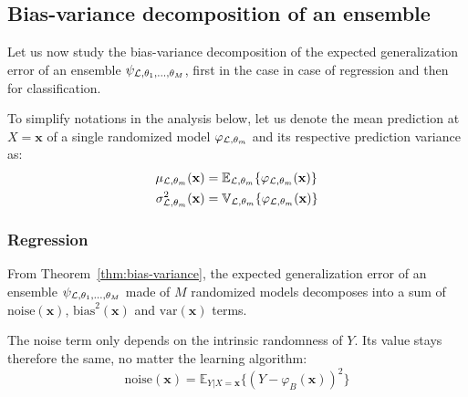 \subsection{Bias-variance decomposition of an ensemble}
\label{sec:4:bias-variance:ensemble}

Let us now study the bias-variance decomposition of the expected generalization
error of an ensemble $\psi_{{\cal L},\theta_1,\dots,\theta_M}$, first in the
case in case of regression and then for classification.

To simplify notations in the analysis below, let us denote the mean prediction at
$X=\mathbf{x}$ of a single randomized model $\varphi_{{\cal L},\theta_m}$ and its
respective prediction variance as:
\begin{align}
\mu_{{\cal L},\theta_m}(\mathbf{x}) &= \mathbb{E}_{{\cal L},\theta_m} \{ \varphi_{{\cal L},\theta_m}(\mathbf{x}) \} \label{eqn:4:mu} \\
\sigma^2_{{\cal L},\theta_m}(\mathbf{x}) &= \mathbb{V}_{{\cal L},\theta_m} \{ \varphi_{{\cal L},\theta_m}(\mathbf{x}) \label{eqn:4:sigma} \}
\end{align}

\subsubsection{Regression}

From Theorem~\ref{thm:bias-variance}, the expected generalization error of an
ensemble $\psi_{{\cal L},\theta_1,\dots,\theta_M}$ made of $M$ randomized
models decomposes into a sum of $\text{noise}(\mathbf{x})$,
$\text{bias}^2(\mathbf{x})$ and $\text{var}(\mathbf{x})$ terms.

The noise term only depends on the intrinsic randomness of $Y$. Its value
stays therefore the same, no matter the learning algorithm:
\begin{equation}
\text{noise}(\mathbf{x}) = \mathbb{E}_{Y|X=\mathbf{x}} \{ (Y - \varphi_B(\mathbf{x}))^2 \}
\end{equation}

